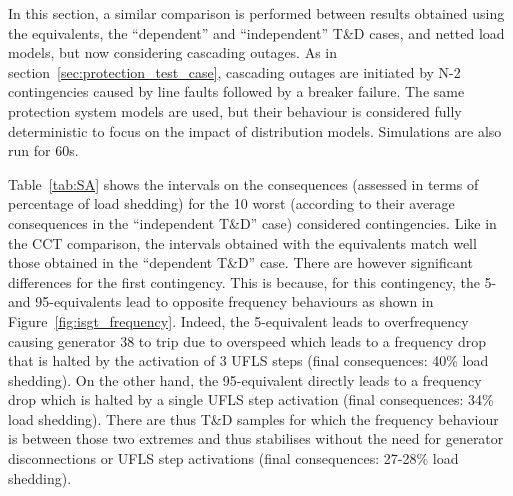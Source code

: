 In this section, a similar comparison is performed between results obtained using the equivalents, the ``dependent'' and ``independent'' T\&D cases, and netted load models, but now considering cascading outages. As in section~\ref{sec:protection_test_case}, cascading outages are initiated by N-2 contingencies caused by line faults followed by a breaker failure. The same protection system models are used, but their behaviour is considered fully deterministic to focus on the impact of distribution models. Simulations are also run for 60s.

Table~\ref{tab:SA} shows the intervals on the consequences (assessed in terms of percentage of load shedding) for the 10 worst (according to their average consequences in the ``independent T\&D'' case) considered contingencies. Like in the CCT comparison, the intervals obtained with the equivalents match well those obtained in the ``dependent T\&D'' case. There are however significant differences for the first contingency. This is because, for this contingency, the 5- and 95-equivalents lead to opposite frequency behaviours as shown in Figure~\ref{fig:isgt_frequency}. Indeed, the 5-equivalent leads to overfrequency causing generator 38 to trip due to overspeed which leads to a frequency drop that is halted by the activation of 3 UFLS steps (final consequences: 40\% load shedding). On the other hand, the 95-equivalent directly leads to a frequency drop which is halted by a single UFLS step activation (final consequences: 34\% load shedding). There are thus  T\&D samples for which the frequency behaviour is between those two extremes and thus stabilises without the need for generator disconnections or UFLS step activations (final consequences: 27-28\% load shedding).


